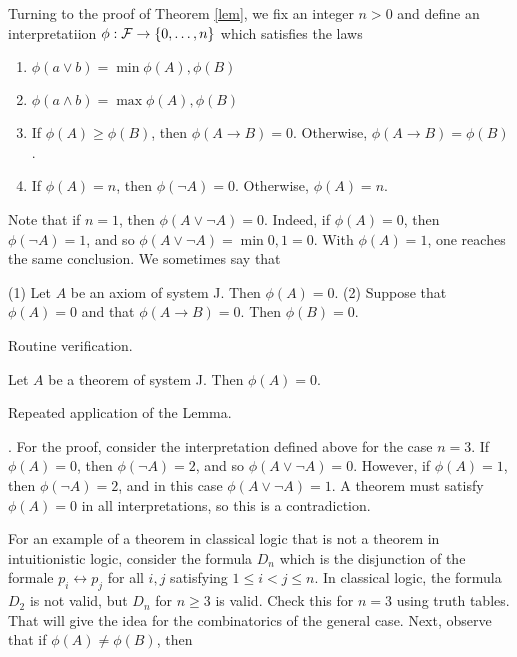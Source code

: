 Turning to the proof of Theorem \ref{lem},  we fix an integer $n > 0$ and define an interpretatiion $\phi: \mathcal{F} \to \{ 0, \ldots, n \}$ which satisfies the laws


\begin{enumerate}

\item $\phi(a \lor b) = \min \phi(A), \phi(B)$

\item  $\phi(a \land b) = \max \phi(A), \phi(B)$

\item If $\phi(A) \ge \phi(B)$, then $\phi(A \to B) = 0$.  Otherwise,
$\phi(A \to B) = \phi(B)$.

\item If $\phi(A) = n$, then $\phi(\neg A) = 0$.  Otherwise, $\phi(A) = n$.

\end{enumerate}

Note that if $n = 1$, then $\phi(A \lor \neg A) = 0$.  Indeed, if $\phi(A) = 0$, then $\phi(\neg A) =1$, and so $\phi(A \lor \neg A) = \min 0, 1 = 0$.  With $\phi(A) = 1$, one reaches the same conclusion.  We sometimes say that 

\begin{lemma}
(1) Let $A$ be an axiom of system J. Then $\phi(A) = 0$. (2) Suppose that $\phi(A) = 0$ and that $\phi(A \to B) = 0$.  Then $\phi(B) = 0$.
\end{lemma}

  Routine verification.

\begin{theorem}
Let $A$ be a theorem of system J.  Then $\phi(A) = 0$.
\end{theorem}

  Repeated application of the Lemma. 



 . For the proof, consider the interpretation defined above for the case $n =3$.  If $\phi(A) = 0$, then $\phi(\neg A) = 2$, and so $\phi(A \lor \neg A) = 0$.  However, if $\phi(A) = 1$, then $\phi(\neg A) = 2$, and in this case  $\phi(A \lor \neg A) = 1$.  A theorem must satisfy $\phi(A) = 0$ in all interpretations, so this is a contradiction. 

For an example of a theorem in classical logic that is not a theorem in intuitionistic logic, consider the formula $D_n$ which is the disjunction of the formale $p_i \leftrightarrow p_j$ for all $i, j$ satisfying $1 \le i < j \le n$. In classical logic, the formula $D_2$ is not valid, but $D_n$ for $n \ge 3$ is valid.  Check this for $n = 3$ using truth tables. That will give the idea for the combinatorics of the general case. Next, observe that  if $\phi(A) \ne \phi(B)$,  then

